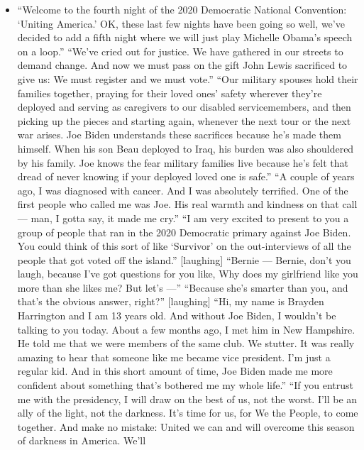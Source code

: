 \begin{itemize}
\tightlist
\item
  ``Welcome to the fourth night of the 2020 Democratic National
  Convention: `Uniting America.' OK, these last few nights have been
  going so well, we've decided to add a fifth night where we will just
  play Michelle Obama's speech on a loop.'' ``We've cried out for
  justice. We have gathered in our streets to demand change. And now we
  must pass on the gift John Lewis sacrificed to give us: We must
  register and we must vote.'' ``Our military spouses hold their
  families together, praying for their loved ones' safety wherever
  they're deployed and serving as caregivers to our disabled
  servicemembers, and then picking up the pieces and starting again,
  whenever the next tour or the next war arises. Joe Biden understands
  these sacrifices because he's made them himself. When his son Beau
  deployed to Iraq, his burden was also shouldered by his family. Joe
  knows the fear military families live because he's felt that dread of
  never knowing if your deployed loved one is safe.'' ``A couple of
  years ago, I was diagnosed with cancer. And I was absolutely
  terrified. One of the first people who called me was Joe. His real
  warmth and kindness on that call --- man, I gotta say, it made me
  cry.'' ``I am very excited to present to you a group of people that
  ran in the 2020 Democratic primary against Joe Biden. You could think
  of this sort of like `Survivor' on the out-interviews of all the
  people that got voted off the island.'' {[}laughing{]} ``Bernie ---
  Bernie, don't you laugh, because I've got questions for you like, Why
  does my girlfriend like you more than she likes me? But let's ---''
  ``Because she's smarter than you, and that's the obvious answer,
  right?'' {[}laughing{]} ``Hi, my name is Brayden Harrington and I am
  13 years old. And without Joe Biden, I wouldn't be talking to you
  today. About a few months ago, I met him in New Hampshire. He told me
  that we were members of the same club. We stutter. It was really
  amazing to hear that someone like me became vice president. I'm just a
  regular kid. And in this short amount of time, Joe Biden made me more
  confident about something that's bothered me my whole life.'' ``If you
  entrust me with the presidency, I will draw on the best of us, not the
  worst. I'll be an ally of the light, not the darkness. It's time for
  us, for We the People, to come together. And make no mistake: United
  we can and will overcome this season of darkness in America. We'll

\end{itemize}
